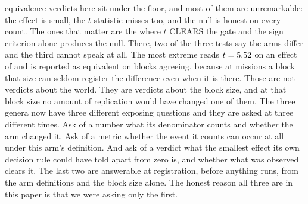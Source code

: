 \documentclass[11pt]{article}
\begin{document}
\FlEqBelow{} equivalence verdicts here sit under the floor, and most of them are unremarkable: the effect is small, the $t$ statistic misses too, and the null is honest on every count. The ones that matter are the \FlSignOnly{} where $t$ CLEARS the gate and the sign criterion alone produces the null. There, two of the three tests say the arms differ and the third cannot speak at all. The most extreme reads $t = 5.52{}$ on an effect of \FlSignOnlyMaxEff{} and is reported as equivalent on \FlSignOnlyBlocks{} blocks agreeing, because at \FlReps{} missions a block that size can seldom register the difference even when it is there. Those \FlSignOnly{} are not verdicts about the world. They are verdicts about the block size, and at that block size no amount of replication would have changed one of them. The three genera now have three different exposing questions and they are asked at three different times. Ask of a number what its denominator counts and whether the arm changed it. Ask of a metric whether the event it counts can occur at all under this arm's definition. And ask of a verdict what the smallest effect its own decision rule could have told apart from zero is, and whether what was observed clears it. The last two are answerable at registration, before anything runs, from the arm definitions and the block size alone. The honest reason all three are in this paper is that we were asking only the first.
\end{document}
